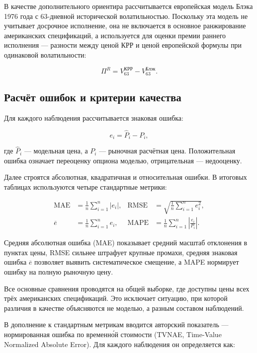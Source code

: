 \documentclass[11pt,a4paper]{article}
\begin{document}
В качестве дополнительного ориентира рассчитывается европейская модель Блэка 1976 года с 63-дневной исторической волатильностью. Поскольку эта модель не учитывает досрочное исполнение, она не включается в основное ранжирование американских спецификаций, а используется для оценки премии раннего исполнения --- разности между ценой КРР и ценой европейской формулы при одинаковой волатильности:

\begin{equation}
\Pi^{R} = V^{\text{КРР}}_{63} - V^{\text{Блэк}}_{63}.
\end{equation}

\subsection{Расчёт ошибок и критерии качества}

Для каждого наблюдения рассчитывается знаковая ошибка:

\begin{equation}
e_i = \widehat{P}_i - P_i,
\end{equation}

где $\widehat{P}_i$ --- модельная цена, а $P_i$ --- рыночная расчётная цена. Положительная ошибка означает переоценку опциона моделью, отрицательная --- недооценку.

Далее строятся абсолютная, квадратичная и относительная ошибки. В итоговых таблицах используются четыре стандартные метрики:

\begin{align}
\text{MAE}  &= \frac{1}{n}\sum_{i=1}^{n}|e_i|, &
\text{RMSE} &= \sqrt{\frac{1}{n}\sum_{i=1}^{n}e_i^{2}}, \\[4pt]
\overline{e} &= \frac{1}{n}\sum_{i=1}^{n}e_i, &
\text{MAPE} &= \frac{1}{n}\sum_{i=1}^{n}\left|\frac{e_i}{P_i}\right|.
\end{align}

Средняя абсолютная ошибка (MAE) показывает средний масштаб отклонения в пунктах цены, RMSE сильнее штрафует крупные промахи, средняя знаковая ошибка $\overline{e}$ позволяет выявить систематическое смещение, а MAPE нормирует ошибку на полную рыночную цену.

Все основные сравнения проводятся на общей выборке, где доступны цены всех трёх американских спецификаций. Это исключает ситуацию, при которой различия в качестве объясняются не моделью, а разным составом наблюдений.

В дополнение к стандартным метрикам вводится авторский показатель --- нормированная ошибка по временно́й стоимости (TVNAE, Time-Value Normalized Absolute Error). Для каждого наблюдения он определяется как:
\end{document}
